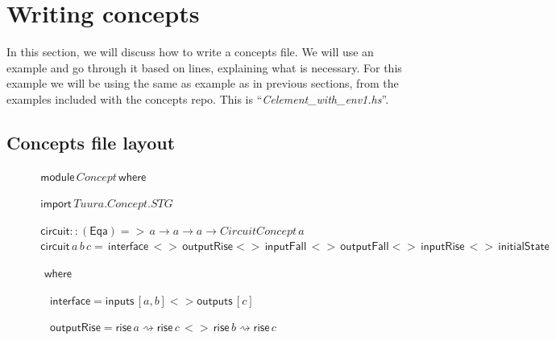 \documentclass{proc}
\begin{document}
\section{Writing concepts \label{sec:concepts_layout}}

In this section, we will discuss how to write a concepts file. 
We will use an example and go through it based on lines, explaining what is necessary. For this example we will be using the same 
as example as in previous sections, from the examples included with the concepts repo. This is ``\emph{Celement\_with\_env1.hs}''.

\subsection{Concepts file layout}

\begin{figure}[H]
\begin{centering}

\begin{flushleft}
$\,\mathsf{module}\, Concept \, \mathsf{where}$
\par\end{flushleft}

\begin{flushleft}
$\,\mathsf{import}\, Tuura.Concept.STG$
\par\end{flushleft}

\begin{flushleft}
$\,\mathsf{circuit :: (Eq a) =>}\, a \rightarrow a \rightarrow  a \rightarrow  CircuitConcept\,a$\\
$\,\mathsf{circuit}\,a \,b \,c=\mathsf{\,interface}\,<> \mathsf{\, outputRise}<>\,\mathsf{inputFall}\,<>\,\mathsf{outputFall}<>\mathsf{\, inputRise}\,<>\,\mathsf{initialState}$

$\,\,\,\mathsf{where}$
\par\end{flushleft}

\begin{flushleft}
$\,\,\,\,\,\,\mathsf{interface}=\mathsf{inputs}\,[a,b]<>\mathsf{outputs}\,[c]$
\par\end{flushleft}

\begin{flushleft}
$\,\,\,\,\,\,\mathsf{outputRise}=\mathsf{rise} \,a\rightsquigarrow \mathsf{rise} \,c\,<>\, \mathsf{rise} \,b\rightsquigarrow \mathsf{rise} \,c$
\par\end{flushleft}


\end{centering}
\end{figure}
\end{document}
